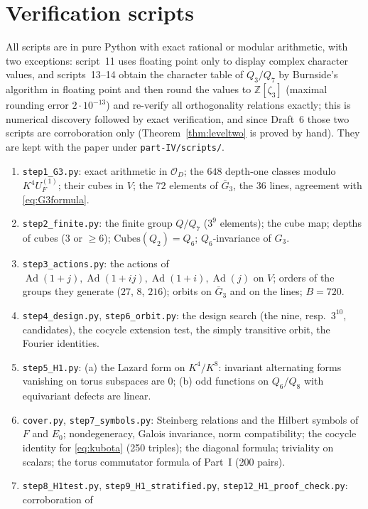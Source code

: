 \documentclass[11pt]{article}
\newcommand{\Z}{\mathbb Z}
\newcommand{\Ad}{\operatorname{Ad}}
\newcommand{\Ocal}{\mathcal O}
\newcommand{\Cubes}{\mathrm{Cubes}}
\theoremstyle{plain}
\theoremstyle{definition}
\begin{document}
\section{Verification scripts}\label{app:scripts}
All scripts are in pure Python with exact rational or modular
arithmetic, with two exceptions: script~11 uses floating point only to
display complex character values, and scripts~13--14 obtain the
character table of $Q_3/Q_7$ by Burnside's algorithm in floating point
and then round the values to $\Z[\zeta_3]$ (maximal rounding error
$2\cdot10^{-13}$) and re-verify all orthogonality relations exactly;
this is numerical discovery followed by exact verification, and since
Draft~6 those two scripts are corroboration only
(Theorem~\ref{thm:leveltwo} is proved by hand).  They are kept with the
paper under \texttt{part-IV/scripts/}.
\begin{enumerate}[label=\arabic*.]
\item \texttt{step1\_G3.py}: exact arithmetic in $\Ocal_D$; the $648$
depth-one classes modulo $K^4U_F^{(1)}$; their cubes in $V$; the $72$
elements of $\bar G_3$, the $36$ lines, agreement with \eqref{eq:G3formula}.
\item \texttt{step2\_finite.py}: the finite group $Q/Q_7$ ($3^9$
elements); the cube map; depths of cubes ($3$ or $\ge6$);
$\Cubes(Q_2)=Q_6$; $Q_6$-invariance of $G_3$.
\item \texttt{step3\_actions.py}: the actions of $\Ad(1+j),\Ad(1+ij),\Ad(1+i),\Ad(j)$
on $V$; orders of the groups they generate ($27$, $8$, $216$); orbits on
$\bar G_3$ and on the lines; $B=720$.
\item \texttt{step4\_design.py}, \texttt{step6\_orbit.py}: the design
search (the nine, resp.\ $3^{10}$, candidates), the cocycle extension
test, the simply transitive orbit, the Fourier identities.
\item \texttt{step5\_H1.py}: (a) the Lazard form on $K^4/K^8$:
invariant alternating forms vanishing on torus subspaces are $0$;
(b) odd functions on $Q_6/Q_8$ with equivariant defects are linear.
\item \texttt{cover.py}, \texttt{step7\_symbols.py}: Steinberg
relations and the Hilbert symbols of $F$ and $E_0$; nondegeneracy,
Galois invariance, norm compatibility; the cocycle identity for
\eqref{eq:kubota} (250 triples); the diagonal formula; triviality on
scalars; the torus commutator formula of Part~I (200 pairs).
\item \texttt{step8\_H1test.py}, \texttt{step9\_H1\_stratified.py},
\texttt{step12\_H1\_proof\_check.py}: corroboration of

\end{enumerate}
\end{document}
